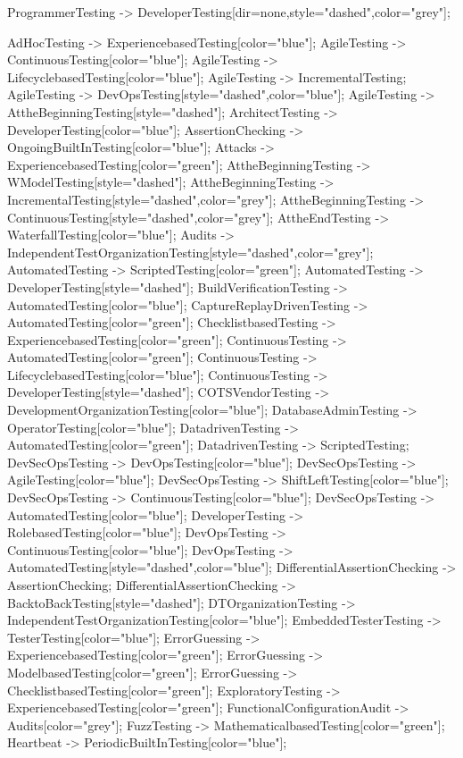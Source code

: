 \documentclass{article}
\begin{document}
{ProgrammerTesting -> DeveloperTesting[dir=none,style="dashed",color="grey"];

AdHocTesting -> ExperiencebasedTesting[color="blue"];
AgileTesting -> ContinuousTesting[color="blue"];
AgileTesting -> LifecyclebasedTesting[color="blue"];
AgileTesting -> IncrementalTesting;
AgileTesting -> DevOpsTesting[style="dashed",color="blue"];
AgileTesting -> AttheBeginningTesting[style="dashed"];
ArchitectTesting -> DeveloperTesting[color="blue"];
AssertionChecking -> OngoingBuiltInTesting[color="blue"];
Attacks -> ExperiencebasedTesting[color="green"];
AttheBeginningTesting -> WModelTesting[style="dashed"];
AttheBeginningTesting -> IncrementalTesting[style="dashed",color="grey"];
AttheBeginningTesting -> ContinuousTesting[style="dashed",color="grey"];
AttheEndTesting -> WaterfallTesting[color="blue"];
Audits -> IndependentTestOrganizationTesting[style="dashed",color="grey"];
AutomatedTesting -> ScriptedTesting[color="green"];
AutomatedTesting -> DeveloperTesting[style="dashed"];
BuildVerificationTesting -> AutomatedTesting[color="blue"];
CaptureReplayDrivenTesting -> AutomatedTesting[color="green"];
ChecklistbasedTesting -> ExperiencebasedTesting[color="green"];
ContinuousTesting -> AutomatedTesting[color="green"];
ContinuousTesting -> LifecyclebasedTesting[color="blue"];
ContinuousTesting -> DeveloperTesting[style="dashed"];
COTSVendorTesting -> DevelopmentOrganizationTesting[color="blue"];
DatabaseAdminTesting -> OperatorTesting[color="blue"];
DatadrivenTesting -> AutomatedTesting[color="green"];
DatadrivenTesting -> ScriptedTesting;
DevSecOpsTesting -> DevOpsTesting[color="blue"];
DevSecOpsTesting -> AgileTesting[color="blue"];
DevSecOpsTesting -> ShiftLeftTesting[color="blue"];
DevSecOpsTesting -> ContinuousTesting[color="blue"];
DevSecOpsTesting -> AutomatedTesting[color="blue"];
DeveloperTesting -> RolebasedTesting[color="blue"];
DevOpsTesting -> ContinuousTesting[color="blue"];
DevOpsTesting -> AutomatedTesting[style="dashed",color="blue"];
DifferentialAssertionChecking -> AssertionChecking;
DifferentialAssertionChecking -> BacktoBackTesting[style="dashed"];
DTOrganizationTesting -> IndependentTestOrganizationTesting[color="blue"];
EmbeddedTesterTesting -> TesterTesting[color="blue"];
ErrorGuessing -> ExperiencebasedTesting[color="green"];
ErrorGuessing -> ModelbasedTesting[color="green"];
ErrorGuessing -> ChecklistbasedTesting[color="green"];
ExploratoryTesting -> ExperiencebasedTesting[color="green"];
FunctionalConfigurationAudit -> Audits[color="grey"];
FuzzTesting -> MathematicalbasedTesting[color="green"];
Heartbeat -> PeriodicBuiltInTesting[color="blue"];
}
\end{document}
